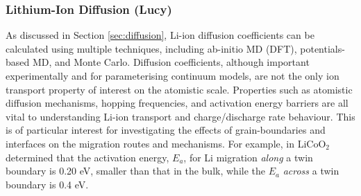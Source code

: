 \documentclass[../main.tex]{subfiles}
\begin{document}

\subsubsection{Lithium-Ion Diffusion (Lucy)}
\label{sec:cathode_ion_diffusion}
As discussed in Section \ref{sec:diffusion}, Li-ion diffusion coefficients can be calculated using multiple techniques, including ab-initio MD (DFT), potentials-based MD, and Monte Carlo. Diffusion coefficients, although important experimentally and for parameterising continuum models, are not the only ion transport property of interest on the atomistic scale. Properties such as atomistic diffusion mechanisms, hopping frequencies, and activation energy barriers are all vital to understanding Li-ion transport and charge/discharge rate behaviour. This is of particular interest for investigating the effects of grain-boundaries and interfaces on the migration routes and mechanisms. For example, in LiCoO$_2$ \citeauthor{moriwake2013first} determined that the activation energy, $E_a$, for Li migration \textit{along} a twin boundary is 0.20 eV, smaller than that in the bulk, while the $E_a$ \textit{across} a twin boundary is 0.4 eV. \cite{moriwake2013first}
\end{document}
